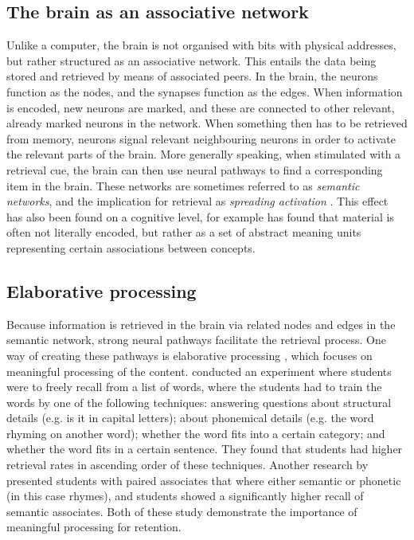 \subsection{The brain as an associative network}

Unlike a computer, the brain is not organised with bits with physical addresses, but rather structured as an associative network. This entails the data being stored and retrieved by means of associated peers. In the brain, the neurons function as the nodes, and the synapses function as the edges. When information is encoded, new neurons are marked, and these are connected to other relevant, already marked neurons in the network. When something then has to be retrieved from memory, neurons signal relevant neighbouring neurons in order to activate the relevant parts of the brain. More generally speaking, when stimulated with a retrieval cue, the brain can then use neural pathways to find a corresponding item in the brain. These networks are sometimes referred to as \emph{semantic networks}, and the implication for retrieval as \emph{spreading activation} \cite{cognitivepsychology}. This effect has also been found on a cognitive level, for example  has found that material is often not literally encoded, but rather as a set of abstract meaning units representing certain associations between concepts.

\subsection{Elaborative processing}

Because information is retrieved in the brain via related nodes and edges in the semantic network, strong neural pathways facilitate the retrieval process. One way of creating these pathways is elaborative processing \cite{karpicke4, cognitivepsychology}, which focuses on meaningful processing of the content.  conducted an experiment where students were to freely recall from a list of words, where the students had to train the words by one of the following techniques: answering questions about structural details (e.g. is it in capital letters); about phonemical details (e.g. the word rhyming on another word); whether the word fits into a certain category; and whether the word fits in a certain sentence. They found that students had higher retrieval rates in ascending order of these techniques. Another research by  presented students with paired associates that where either semantic or phonetic (in this case rhymes), and students showed a significantly higher recall of semantic associates. Both of these study demonstrate the importance of meaningful processing for retention.

